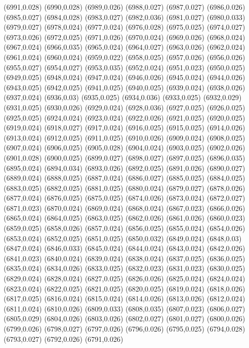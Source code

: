 (6991,0.028)
(6990,0.028)
(6989,0.026)
(6988,0.027)
(6987,0.027)
(6986,0.026)
(6985,0.027)
(6984,0.028)
(6983,0.027)
(6982,0.036)
(6981,0.027)
(6980,0.033)
(6979,0.027)
(6978,0.024)
(6977,0.024)
(6976,0.028)
(6975,0.025)
(6974,0.027)
(6973,0.026)
(6972,0.025)
(6971,0.026)
(6970,0.024)
(6969,0.026)
(6968,0.024)
(6967,0.024)
(6966,0.035)
(6965,0.024)
(6964,0.027)
(6963,0.026)
(6962,0.024)
(6961,0.024)
(6960,0.024)
(6959,0.022)
(6958,0.025)
(6957,0.026)
(6956,0.026)
(6955,0.027)
(6954,0.027)
(6953,0.035)
(6952,0.024)
(6951,0.023)
(6950,0.025)
(6949,0.025)
(6948,0.024)
(6947,0.024)
(6946,0.026)
(6945,0.024)
(6944,0.026)
(6943,0.025)
(6942,0.025)
(6941,0.025)
(6940,0.025)
(6939,0.024)
(6938,0.026)
(6937,0.024)
(6936,0.03)
(6935,0.025)
(6934,0.036)
(6933,0.025)
(6932,0.029)
(6931,0.025)
(6930,0.026)
(6929,0.024)
(6928,0.036)
(6927,0.025)
(6926,0.025)
(6925,0.025)
(6924,0.024)
(6923,0.024)
(6922,0.026)
(6921,0.025)
(6920,0.025)
(6919,0.024)
(6918,0.027)
(6917,0.024)
(6916,0.025)
(6915,0.025)
(6914,0.026)
(6913,0.024)
(6912,0.025)
(6911,0.025)
(6910,0.026)
(6909,0.024)
(6908,0.025)
(6907,0.024)
(6906,0.025)
(6905,0.028)
(6904,0.024)
(6903,0.025)
(6902,0.026)
(6901,0.028)
(6900,0.025)
(6899,0.027)
(6898,0.027)
(6897,0.025)
(6896,0.035)
(6895,0.024)
(6894,0.034)
(6893,0.026)
(6892,0.025)
(6891,0.026)
(6890,0.027)
(6889,0.024)
(6888,0.025)
(6887,0.024)
(6886,0.027)
(6885,0.025)
(6884,0.025)
(6883,0.025)
(6882,0.025)
(6881,0.025)
(6880,0.024)
(6879,0.027)
(6878,0.026)
(6877,0.024)
(6876,0.025)
(6875,0.025)
(6874,0.026)
(6873,0.024)
(6872,0.027)
(6871,0.023)
(6870,0.024)
(6869,0.024)
(6868,0.024)
(6867,0.023)
(6866,0.026)
(6865,0.024)
(6864,0.025)
(6863,0.025)
(6862,0.026)
(6861,0.026)
(6860,0.023)
(6859,0.025)
(6858,0.026)
(6857,0.024)
(6856,0.025)
(6855,0.024)
(6854,0.026)
(6853,0.024)
(6852,0.025)
(6851,0.025)
(6850,0.032)
(6849,0.024)
(6848,0.03)
(6847,0.024)
(6846,0.033)
(6845,0.024)
(6844,0.024)
(6843,0.024)
(6842,0.026)
(6841,0.023)
(6840,0.024)
(6839,0.024)
(6838,0.024)
(6837,0.025)
(6836,0.025)
(6835,0.024)
(6834,0.026)
(6833,0.025)
(6832,0.023)
(6831,0.023)
(6830,0.025)
(6829,0.024)
(6828,0.024)
(6827,0.025)
(6826,0.026)
(6825,0.024)
(6824,0.024)
(6823,0.024)
(6822,0.025)
(6821,0.025)
(6820,0.025)
(6819,0.024)
(6818,0.026)
(6817,0.025)
(6816,0.024)
(6815,0.024)
(6814,0.026)
(6813,0.026)
(6812,0.024)
(6811,0.024)
(6810,0.026)
(6809,0.033)
(6808,0.035)
(6807,0.023)
(6806,0.027)
(6805,0.029)
(6804,0.026)
(6803,0.026)
(6802,0.027)
(6801,0.027)
(6800,0.026)
(6799,0.026)
(6798,0.027)
(6797,0.026)
(6796,0.026)
(6795,0.025)
(6794,0.028)
(6793,0.027)
(6792,0.026)
(6791,0.026)
